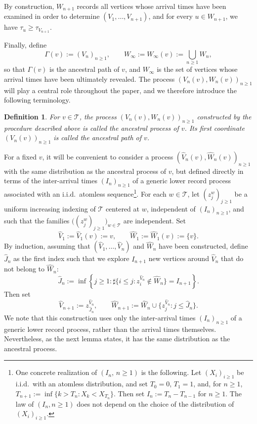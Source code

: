\documentclass[french]{article}
\newcommand{\zi}{z}
\newtheorem{defi}[theorem]{Definition}
\newcommand{\T}{\mathcal{T}}
\renewcommand{\1}{\mathds{1}}
\begin{document}
By construction, $W_{n+1}$ records all vertices whose arrival times have been examined in order to determine $(V_1,\ldots,V_{n+1})$, and for every $u \in W_{n+1}$, we have $\tau_u \ge \tau_{V_{n+1}}$.

Finally, define
\[
\Gamma(v):=(V_n)_{n\ge 1},
\qquad
W_\infty := W_\infty(v) := \bigcup_{n \ge 1} W_n,
\]
so that $\Gamma(v)$ is the ancestral path of $v$, and $W_\infty$ is the set of vertices whose arrival times have been ultimately revealed. The process $(V_n(v), W_n(v))_{n \ge 1}$ will play a central role throughout the paper, and we therefore introduce the following terminology.

\begin{defi}
For \( v \in \T \), the process \( (V_n(v), W_n(v))_{n \ge 1} \) constructed by the procedure described above is called the \emph{ancestral process} of \( v \). Its first coordinate \( (V_n(v))_{n \ge 1} \) is called the \emph{ancestral path} of \( v \).
\end{defi}

For a fixed $v$, it will be convenient to consider a process $(\hat{V}_n(v), \hat{W}_n(v))_{n \ge 1}$ with the same distribution as the ancestral process of $v$, but defined directly in terms of 
the inter-arrival times $(I_n)_{n \ge 1}$ of a generic lower record process associated with an i.i.d.\ atomless sequence\footnote{One concrete realization of $(I_n,\, n\geq 1)$ is the following. Let $(X_i)_{i \ge 1}$ be i.i.d.\ with an atomless distribution, and set $T_0=0$, $T_1=1$, and, for $n\ge1$, $T_{n+1}:=\inf\{k>T_n:X_k<X_{T_n}\}$. Then set $I_n:=T_n-T_{n-1}$ for $n\ge 1$. The law of $(I_n, n\ge 1)$ does not depend on the choice of the distribution of $(X_i)_{i \ge 1}$.}. For each $w \in \T$, let $(\zi_j^w)_{j \geq 1}$ be a uniform increasing indexing of $\T$ centered at $w$, independent of $(I_n)_{n \geq 1}$, and such that the families $\bigl((\zi_j^w)_{j \geq 1}\bigr)_{w \in \T}$ are independent. Set 
\[
\hat{V}_1 := \hat{V}_1(v) := v,
\qquad
\hat{W}_1 := \hat{W}_1(v) := \{v\}.
\]
By induction, assuming that $(\hat{V}_1,\dots,\hat{V}_n)$ and $\hat{W}_n$ have been constructed, define $\hat{J}_n$ as the first index such that we explore $I_{n+1}$ new vertices around $\hat{V}_n$ that do not belong to $\hat{W}_n$:
\begin{equation}\label{eq:def1process}
\hat{J}_n := \inf\left\{j \ge 1 : \sharp\{i \le j : \zi_i^{\hat{V}_n} \notin \hat{W}_n\}=I_{n+1}\right\}.
\end{equation}
Then set
\begin{equation}\label{eq:def2process}
\hat{V}_{n+1} := \zi_{\hat{J}_n}^{\hat{V}_n},
\qquad
\hat{W}_{n+1} := \hat{W}_n \cup \{\zi_j^{\hat{V}_n} : j \le \hat{J}_n\}.
\end{equation}
We note that this construction uses only the inter-arrival times $(I_n)_{n \ge 1}$ of a generic lower record process, rather than the arrival times themselves. Nevertheless, as the next lemma states, it has the same distribution as the ancestral process.
\end{document}
